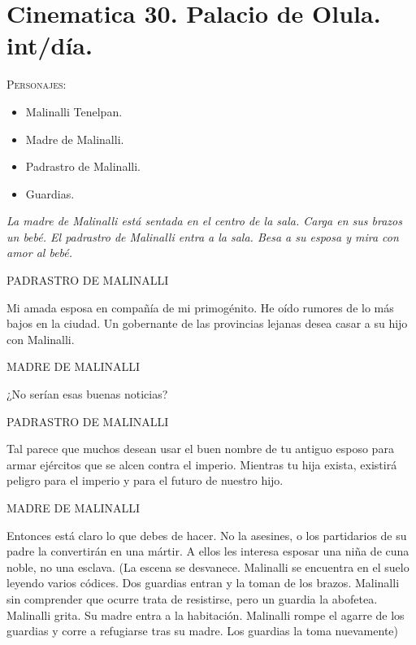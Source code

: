 \documentclass[11pt,letterpaper]{article}
\begin{document}
\section{Cinematica 30. Palacio de Olula. int/día. }
 \textsc{Personajes}:
 \begin{itemize}
 \item Malinalli Tenelpan.
\item Madre de Malinalli.
\item Padrastro de Malinalli.
\item Guardias.
 \end{itemize}
\textit{La madre de Malinalli está sentada en el centro de la sala. Carga en sus brazos un bebé. El padrastro de Malinalli entra a la sala. Besa a su esposa y mira con amor al bebé.}
\begin{center}
PADRASTRO DE MALINALLI
\\
\par
Mi amada esposa en compañía de mi primogénito. He oído rumores de lo más bajos en la ciudad. Un gobernante de las provincias lejanas desea casar a su hijo con Malinalli.
\\
\par
MADRE DE MALINALLI
\\
\par
¿No serían esas buenas noticias?
\\
\par
PADRASTRO DE MALINALLI
\\
\par
Tal parece que muchos desean usar el buen nombre de tu antiguo esposo para armar ejércitos que se alcen contra el imperio. Mientras tu hija exista, existirá peligro para el imperio y para el futuro de nuestro hijo.
\\
\par
MADRE DE MALINALLI
\\
\par
Entonces está claro lo que debes de hacer. No la asesines, o los partidarios de su padre la convertirán en una mártir. A ellos les interesa esposar una niña de cuna noble, no una esclava. 
(La escena se desvanece. Malinalli se encuentra en el suelo leyendo varios códices. Dos guardias entran y la toman de los brazos. Malinalli sin comprender que ocurre trata de resistirse, pero un guardia la abofetea. Malinalli grita. Su madre entra a la habitación. Malinalli rompe el agarre de los guardias y corre a refugiarse tras su madre. Los guardias la toma nuevamente)
\\
\par

\end{center}
\end{document}
